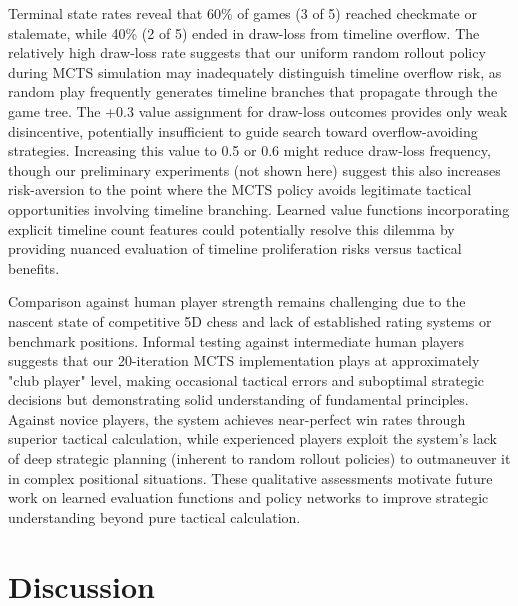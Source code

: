 \documentclass{article}
\begin{document}
Terminal state rates reveal that 60\% of games (3 of 5) reached checkmate or stalemate, while 40\% (2 of 5) ended in draw-loss from timeline overflow. The relatively high draw-loss rate suggests that our uniform random rollout policy during MCTS simulation may inadequately distinguish timeline overflow risk, as random play frequently generates timeline branches that propagate through the game tree. The +0.3 value assignment for draw-loss outcomes provides only weak disincentive, potentially insufficient to guide search toward overflow-avoiding strategies. Increasing this value to 0.5 or 0.6 might reduce draw-loss frequency, though our preliminary experiments (not shown here) suggest this also increases risk-aversion to the point where the MCTS policy avoids legitimate tactical opportunities involving timeline branching. Learned value functions incorporating explicit timeline count features could potentially resolve this dilemma by providing nuanced evaluation of timeline proliferation risks versus tactical benefits.

Comparison against human player strength remains challenging due to the nascent state of competitive 5D chess and lack of established rating systems or benchmark positions. Informal testing against intermediate human players suggests that our 20-iteration MCTS implementation plays at approximately "club player" level, making occasional tactical errors and suboptimal strategic decisions but demonstrating solid understanding of fundamental principles. Against novice players, the system achieves near-perfect win rates through superior tactical calculation, while experienced players exploit the system's lack of deep strategic planning (inherent to random rollout policies) to outmaneuver it in complex positional situations. These qualitative assessments motivate future work on learned evaluation functions and policy networks to improve strategic understanding beyond pure tactical calculation.

\section{Discussion}
\end{document}
